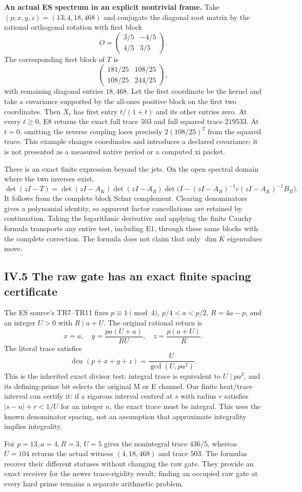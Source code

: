 \textbf{An actual ES spectrum in an explicit nontrivial frame.} Take \((p;x,y,z)=(13;4,18,468)\) and conjugate the diagonal root matrix by the rational orthogonal rotation with first block \[
 O=\begin{pmatrix}3/5&-4/5\\4/5&3/5\end{pmatrix}.
\] The corresponding first block of \(T\) is \[
 \begin{pmatrix}181/25&108/25\\108/25&244/25\end{pmatrix},
\] with remaining diagonal entries \(18,468\). Let the first coordinate be the kernel and take a covariance supported by the all-ones positive block on the first two coordinates. Then \(X_t\) has first entry \(t/(1+t)\) and its other entries zero. At every \(t\ge0\), E8 returns the exact full trace \(503\) and full squared trace \(219533\). At \(t=0\), omitting the reverse coupling loses precisely \(2(108/25)^2\) from the squared trace. This example changes coordinates and introduces a declared covariance; it is not presented as a measured native period or a computed xi packet.

There is an exact finite expression beyond the jets. On the open spectral domain where the two inverses exist, \[
 \det(zI-T)=\det(zI-A_K)\det(zI-A_B)
 \det\bigl(I-(zI-A_B)^{-1}c(zI-A_K)^{-1}B_R\bigr).
 \tag{E9}
\] It follows from the complete block Schur complement. Clearing denominators gives a polynomial identity, so apparent factor cancellations are retained by continuation. Taking the logarithmic derivative and applying the finite Cauchy formula transports any entire test, including E1, through these same blocks with the complete correction. The formula does not claim that only \(\dim K\) eigenvalues move.

\subsection{IV.5 The raw gate has an exact finite spacing certificate}\label{iv.5-the-raw-gate-has-an-exact-finite-spacing-certificate}

The ES source's TR7--TR11 fixes \(p\equiv1\pmod4\), \(p/4<a<p/2\), \(R=4a-p\), and an integer \(U>0\) with \(R\mid a+U\). The original rational return is \[
 x=a,\quad y=\frac{pa(U+a)}{RU},\quad z=\frac{p(a+U)}R.
\] The literal trace satisfies \[
 \operatorname{den}(p+x+y+z)=\frac{U}{\gcd(U,pa^2)}.
 \tag{E10}
\] This is the inherited exact divisor test: integral trace is equivalent to \(U\mid pa^2\), and its defining-prime bit selects the original M or E channel. Our finite heat/trace interval can certify it: if a rigorous interval centred at \(s\) with radius \(r\) satisfies \(|s-n|+r<1/U\) for an integer \(n\), the exact trace must be integral. This uses the known denominator spacing, not an assumption that approximate integrality implies integrality.

For \(p=13,a=4,R=3\), \(U=5\) gives the nonintegral trace \(436/5\), whereas \(U=104\) returns the actual witness \((4,18,468)\) and trace \(503\). The formulas recover their different statuses without changing the raw gate. They provide an exact receiver for the newer trace-rigidity result; finding an occupied raw gate at every hard prime remains a separate arithmetic problem.
